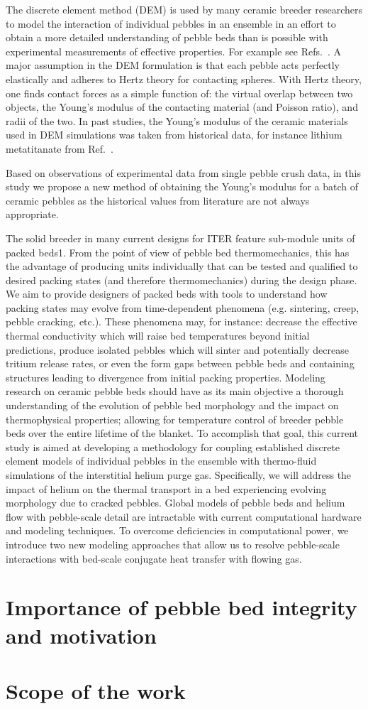 The discrete element method (DEM) is used by many ceramic breeder researchers to model the interaction of individual pebbles in an ensemble in an effort to obtain a more detailed understanding of pebble beds than is possible with experimental measurements of effective properties. For example see Refs.~\cite{An20071393, Lu2000, Zhao2010, Gan2010a, Annabattula2012a, VanLew2014}. A major assumption in the DEM formulation is that each pebble acts perfectly elastically and adheres to Hertz theory for contacting spheres. With Hertz theory, one finds contact forces as a simple function of: the virtual overlap between two objects, the Young's modulus of the contacting material (and Poisson ratio), and radii of the two. In past studies, the Young's modulus of the ceramic materials  used in DEM simulations was taken from historical data, for instance lithium metatitanate from Ref.~\cite{Gierszewski1998}.

Based on observations of experimental data from single pebble crush data, in this study we propose a new method of obtaining the Young's modulus for a batch of ceramic pebbles as the historical values from literature are not always appropriate.


The solid breeder in many current designs for ITER feature sub-module units of packed beds1. From the point of view of pebble bed thermomechanics, this has the advantage of producing units individually that can be tested and qualified to desired packing states (and therefore thermomechanics) during the design phase.
We aim to provide designers of packed beds with tools to understand how packing states may evolve from time-dependent phenomena (e.g. sintering, creep, pebble cracking, etc.). These phenomena may, for instance: decrease the effective thermal conductivity which will raise bed temperatures beyond initial predictions, produce isolated pebbles which will sinter and potentially decrease tritium release rates, or even the form gaps between pebble beds and containing structures leading to divergence from initial packing properties. 
Modeling research on ceramic pebble beds should have as its main objective a thorough understanding of the evolution of pebble bed morphology and the impact on thermophysical properties; allowing for temperature control of breeder pebble beds over the entire lifetime of the blanket. To accomplish that goal, this current study is aimed at developing a methodology for coupling established discrete element models of individual pebbles in the ensemble with thermo-fluid simulations of the interstitial helium purge gas. Specifically, we will address the impact of helium on the thermal transport in a bed experiencing evolving morphology due to cracked pebbles.
Global models of pebble beds and helium flow with pebble-scale detail are intractable with current computational hardware and modeling techniques. To overcome deficiencies in computational power, we introduce two new modeling approaches that allow us to resolve pebble-scale interactions with bed-scale conjugate heat transfer with flowing gas.


\section{Importance of pebble bed integrity and motivation}
\section{Scope of the work}